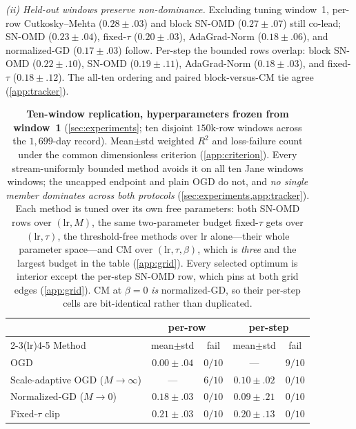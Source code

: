 \documentclass{article}
\begin{document}
\emph{(ii) Held-out windows preserve non-dominance.} Excluding tuning window~1, per-row
Cutkosky--Mehta ($0.28\!\pm\!.03$) and block SN-OMD ($0.27\!\pm\!.07$) still co-lead;
SN-OMD ($0.23\!\pm\!.04$), fixed-$\tau$ ($0.20\!\pm\!.03$), AdaGrad-Norm
($0.18\!\pm\!.06$), and normalized-GD ($0.17\!\pm\!.03$) follow. Per-step the bounded rows
overlap: block SN-OMD ($0.22\!\pm\!.10$), SN-OMD ($0.19\!\pm\!.11$), AdaGrad-Norm
($0.18\!\pm\!.03$), and fixed-$\tau$ ($0.18\!\pm\!.12$). The all-ten ordering and paired
block-versus-CM tie agree (\cref{app:tracker}).

\begin{table}[t]
\caption{\textbf{Ten-window replication, hyperparameters frozen from window~1}
(\cref{sec:experiments}; ten disjoint $150$k-row windows across the $1{,}699$-day record).
Mean$\pm$std weighted $R^2$ and loss-failure count under the common dimensionless criterion
(\cref{app:criterion}). Every stream-uniformly bounded method avoids it on all ten Jane windows
windows; the uncapped endpoint and plain OGD do not, and \emph{no single member dominates across
both protocols} (\cref{sec:experiments,app:tracker}). Each method is tuned over its own free
parameters: both SN-OMD rows over $(\mathrm{lr},M)$, the same two-parameter budget fixed-$\tau$
gets over $(\mathrm{lr},\tau)$, the threshold-free methods over $\mathrm{lr}$ alone---their
whole parameter space---and CM over $(\mathrm{lr},\tau,\beta)$, which is \emph{three} and the
largest budget in the table (\cref{app:grid}). Every selected optimum is interior except the per-step SN-OMD row, which
pins at both grid edges (\cref{app:grid}). CM at $\beta{=}0$ \emph{is} normalized-GD, so their
per-step cells are bit-identical rather than duplicated.}
\label{tab:replication}
\centering
\begin{small}
\setlength{\tabcolsep}{3.5pt}
\begin{tabular}{lcccc}
\toprule
 & \multicolumn{2}{c}{per-row} & \multicolumn{2}{c}{per-step} \\
\cmidrule(lr){2-3}\cmidrule(lr){4-5}
Method & mean$\pm$std & fail & mean$\pm$std & fail \\
\midrule
OGD                                    & $0.00\pm.04$ & $0/10$ & --- & $9/10$ \\
Scale-adaptive OGD ($M\!\to\!\infty$)  & --- & $6/10$ & $0.10\pm.02$ & $0/10$ \\
Normalized-GD ($M\!\to\!0$)            & $0.18\pm.03$ & $0/10$ & $0.09\pm.21$ & $0/10$ \\
Fixed-$\tau$ clip                      & $0.21\pm.03$ & $0/10$ & $0.20\pm.13$ & $0/10$ \\

\end{tabular}
\end{small}
\end{table}
\end{document}
